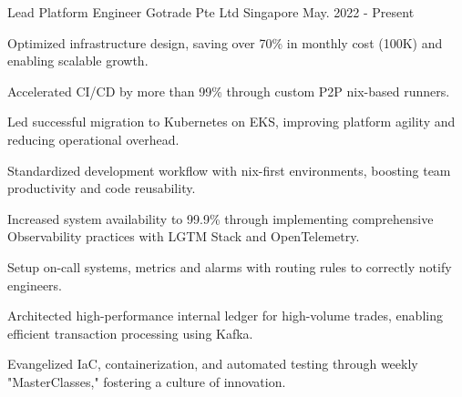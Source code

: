 

\begin{cventries}


    \cventry
    {Lead Platform Engineer} %
    {Gotrade Pte Ltd} %
    {Singapore} %
    {May. 2022 - Present} %
    {
    \begin{cvitems} %
        \item {Optimized infrastructure design, saving over 70\% in monthly cost (100K) and enabling scalable growth.}
        \item {Accelerated CI/CD by more than 99\% through custom P2P nix-based runners.}
        \item {Led successful migration to Kubernetes on EKS, improving platform agility and reducing operational overhead.}
        \item {Standardized development workflow with nix-first environments, boosting team productivity and code reusability.}
        \item {Increased system availability to 99.9\% through implementing comprehensive Observability practices with LGTM Stack and OpenTelemetry.}
        \item {Setup on-call systems, metrics and alarms with routing rules to correctly notify engineers.}
        \item {Architected high-performance internal ledger for high-volume trades, enabling efficient transaction processing using Kafka.}
        \item {Evangelized IaC, containerization, and automated testing through weekly "MasterClasses," fostering a culture of innovation.}
    \end{cvitems}
    }


\end{cventries}

